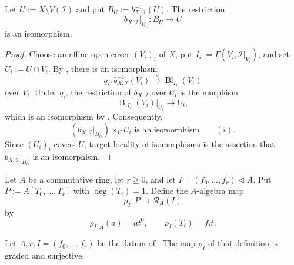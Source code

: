 \begin{theorem}
  \label{thm:nagata-global-blowup-complement}

  Let $U:=X\setminus V(\mathcal I)$ and put
  $B_U:=b_{X,\mathcal I}^{-1}(U)$.  The restriction
  \[
    b_{X,\mathcal I}|_{B_U}\colon B_U\longrightarrow U
  \]
  is an isomorphism.
\end{theorem}

\begin{proof}
  Choose an affine open cover $(V_i)_i$ of $X$, put
  $I_i:=\Gamma(V_i,\mathcal I|_{V_i})$, and set $U_i:=U\cap V_i$.
  By , there is an isomorphism
  \[
    q_i\colon b_{X,\mathcal I}^{-1}(V_i)
      \xrightarrow{\sim}\operatorname{Bl}_{I_i}(V_i)
  \]
  over $V_i$.  Under $q_i$, the restriction of $b_{X,\mathcal I}$ over
  $U_i$ is the morphism
  \[
    \operatorname{Bl}_{I_i}(V_i)|_{U_i}\longrightarrow U_i,
  \]
  which is an isomorphism by
  .  Consequently,
  \[
    (b_{X,\mathcal I}|_{B_U})\times_UU_i
      \text{ is an isomorphism}\qquad(i).
  \]
  Since $(U_i)_i$ covers $U$, target-locality of isomorphisms is the
  assertion that $b_{X,\mathcal I}|_{B_U}$ is an isomorphism.
\end{proof}

\begin{definition}
  \label{def:nagata-rees-polynomial-map}

  Let $A$ be a commutative ring, let $r\geq0$, and let
  $I=(f_0,\ldots,f_r)\triangleleft A$.  Put
  $P:=A[T_0,\ldots,T_r]$ with
  $\deg(T_i)=1$.  Define the $A$-algebra map
  \[
    \rho_I\colon P\longrightarrow\mathcal R_A(I)
  \]
  by
  \[
    \rho_I|_A(a)=at^0,\qquad \rho_I(T_i)=f_it.
  \]
\end{definition}

\begin{lemma}
  \label{lemma:nagata-rees-polynomial-surjection}

  Let $A,r,I=(f_0,\ldots,f_r)$ be the datum of
  .  The map $\rho_I$ of that
  definition is graded and surjective.
\end{lemma}


